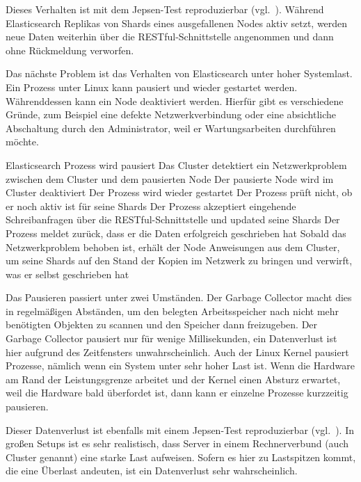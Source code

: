 Dieses Verhalten ist mit dem \gls{Jepsen}\hyp{}Test reproduzierbar
(vgl.~\cite{es_jepsen_iso}). Während Elasticsearch Replikas von Shards eines
ausgefallenen Nodes aktiv setzt, werden neue Daten weiterhin über die
\gls{RESTful}\hyp{}Schnittstelle angenommen und dann ohne Rückmeldung
verworfen.

Das nächste Problem ist das Verhalten von Elasticsearch unter hoher Systemlast.
Ein Prozess unter Linux kann pausiert und wieder gestartet werden.
Währenddessen kann ein Node deaktiviert werden. Hierfür gibt es verschiedene
Gründe, zum Beispiel eine defekte Netzwerkverbindung oder eine absichtliche
Abschaltung durch den Administrator, weil er Wartungsarbeiten durchführen
möchte.

\begin{outline}
  \1 Elasticsearch Prozess wird pausiert
  \1 Das Cluster detektiert ein Netzwerkproblem zwischen dem Cluster und dem
  pausierten Node
  \1 Der pausierte Node wird im Cluster deaktiviert
  \1 Der Prozess wird wieder gestartet
  \1 Der Prozess prüft nicht, ob er noch aktiv ist für seine Shards
  \1 Der Prozess akzeptiert eingehende Schreibanfragen über die
  \gls{RESTful}\hyp{}Schnittstelle und updated seine Shards
  \1 Der Prozess meldet zurück, dass er die Daten erfolgreich geschrieben hat
  \1 Sobald das Netzwerkproblem behoben ist, erhält der Node Anweisungen aus
  dem Cluster, um seine Shards auf den Stand der Kopien im Netzwerk zu bringen
  und verwirft, was er selbst geschrieben hat
\end{outline}

Das Pausieren passiert unter zwei Umständen. Der \gls{Garbage Collector} macht
dies in regelmäßigen Abständen, um den belegten Arbeitsspeicher nach nicht mehr
benötigten Objekten zu scannen und den Speicher dann freizugeben. Der Garbage
Collector pausiert nur für wenige Millisekunden, ein Datenverlust ist hier
aufgrund des Zeitfensters unwahrscheinlich. Auch der Linux Kernel pausiert
Prozesse, nämlich wenn ein System unter sehr hoher Last ist. Wenn die Hardware
am Rand der Leistungsgrenze arbeitet und der Kernel einen Absturz erwartet,
weil die Hardware bald überfordet ist, dann kann er einzelne Prozesse
kurzzeitig pausieren.

Dieser Datenverlust ist ebenfalls mit einem \gls{Jepsen}\hyp{}Test
reproduzierbar (vgl.~\cite{es_jepsen_pause}). In großen Setups ist es sehr
realistisch, dass Server in einem Rechnerverbund (auch Cluster genannt) eine
starke Last aufweisen. Sofern es hier zu Lastspitzen kommt, die eine Überlast
andeuten, ist ein Datenverlust sehr wahrscheinlich.

